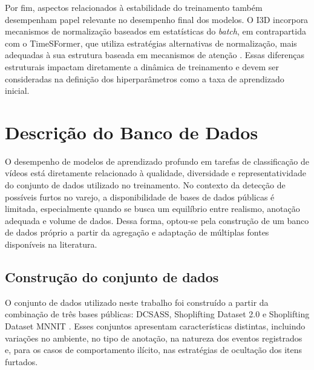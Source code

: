 \documentclass[12pt, %
openright, 
oneside, %
a4paper,    %
brazil]{facom-ufu-abntex2}
\begin{document}
Por fim, aspectos relacionados à estabilidade do treinamento também desempenham papel relevante no desempenho final dos modelos. O I3D incorpora mecanismos de normalização baseados em estatísticas do \textit{batch}, em contrapartida com o TimeSFormer, que utiliza estratégias alternativas de normalização, mais adequadas à sua estrutura baseada em mecanismos de atenção \cite{i3d,timesformer}. Essas diferenças estruturais impactam diretamente a dinâmica de treinamento e devem ser consideradas na definição dos hiperparâmetros como a taxa de aprendizado inicial.

\chapter[Descrição do Banco de Dados]{Descrição do Banco de Dados}

O desempenho de modelos de aprendizado profundo em tarefas de classificação de vídeos está diretamente relacionado à qualidade, diversidade e representatividade do conjunto de dados utilizado no treinamento. No contexto da detecção de possíveis furtos no varejo, a disponibilidade de bases de dados públicas é limitada, especialmente quando se busca um equilíbrio entre realismo, anotação adequada e volume de dados. Dessa forma, optou-se pela construção de um banco de dados próprio a partir da agregação e adaptação de múltiplas fontes disponíveis na literatura.

\section[Construção do conjunto de dados]{Construção do conjunto de dados}

O conjunto de dados utilizado neste trabalho foi construído a partir da combinação de três bases públicas: DCSASS, Shoplifting Dataset 2.0 e Shoplifting Dataset MNNIT \cite{dcsass, shoplifting_20, shoplifting_mnnit}. Esses conjuntos apresentam características distintas, incluindo variações no ambiente, no tipo de anotação, na natureza dos eventos registrados e, para os casos de comportamento ilícito, nas estratégias de ocultação dos itens furtados.
\end{document}
